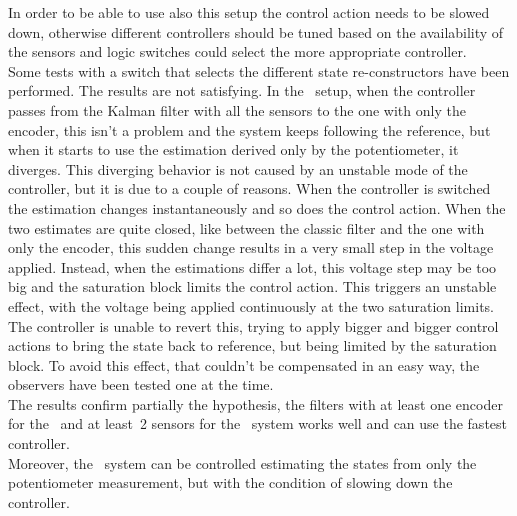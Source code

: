 In order to be able to use also this setup the control action needs to be slowed down, otherwise different controllers should be tuned based on the availability of the sensors and logic switches could select the more appropriate controller. \\

Some tests with a switch that selects the different state re-constructors have been performed. The results are not satisfying. In the \onedof\ setup, when the controller passes from the Kalman filter with all the sensors to the one with only the encoder, this isn't a problem and the system keeps following the reference, but when it starts to use the estimation derived only by the potentiometer, it diverges. This diverging behavior is not caused by an unstable mode of the controller, but it is due to a couple of reasons. When the controller is switched the estimation changes instantaneously and so does the control action. When the two estimates are quite closed, like between the classic filter and the one with only the encoder, this sudden change results in a very small step in the voltage applied. Instead, when the estimations differ a lot, this voltage step may be too big and the saturation block limits the control action. This triggers an unstable effect, with the voltage being applied continuously at the two saturation limits. The controller is unable to revert this, trying to apply bigger and bigger control actions to bring the state back to reference, but being limited by the saturation block. To avoid this effect, that couldn't be compensated in an easy way, the observers have been tested one at the time. \\

The results confirm partially the hypothesis, the filters with at least one encoder for the \onedof\ and at least~2 sensors for the \twodof\ system works well and can use the fastest controller.\\
Moreover, the \onedof\ system can be controlled estimating the states from only the potentiometer measurement, but with the condition of slowing down the controller.\\

